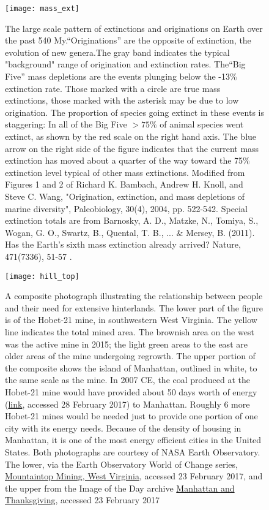\newpage
\begin{figure}[p]
\centering
\texttt{[image: mass\_ext]}%
\caption{The large scale pattern of extinctions and originations on Earth over the past 540 My.``Originations'' are the opposite of extinction, the evolution of new genera.The gray band indicates the typical "background" range of origination and extinction rates. The``Big Five'' mass depletions are the events plunging below the -13\% extinction rate. Those marked with a circle are true mass extinctions, those marked with the asterisk may be due to low origination. The proportion of species going extinct in these events is staggering: In all of the Big Five $>75\%$ of animal species went extinct, as shown by the red scale on the right hand axis. The blue arrow on the right side of the figure indicates that the current mass extinction has moved about a quarter of the way toward the 75\% extinction level typical of other mass extinctions. Modified from Figures 1 and 2 of Richard K. Bambach, Andrew H. Knoll, and Steve C. Wang, "Origination, extinction, and mass depletions of marine diversity", Paleobiology, 30(4), 2004, pp. 522-542. Special extinction totals are from Barnosky, A. D., Matzke, N., Tomiya, S., Wogan, G. O., Swartz, B., Quental, T. B., ... \& Mersey, B. (2011). Has the Earth's sixth mass extinction already arrived? Nature, 471(7336), 51-57 .}
\label{fig:mass_ext}
\end{figure}

\newpage
\begin{figure}[p]
\centering
\texttt{[image: hill\_top]}%

\caption{A composite photograph illustrating the relationship between people and their need for extensive hinterlands. The lower part of the figure is of the Hobet-21 mine, in southwestern West Virginia. The yellow line indicates the total mined area. The brownish area on the west was the active mine in 2015; the light green areas to the east are older areas of the mine undergoing regrowth. The  upper portion of the composite shows the island of Manhattan, outlined in white, to the same scale as the mine. In 2007 CE, the coal produced at the Hobet-21 mine would have provided about 50 days worth of energy (\href{https://www.nycedc.com/economic-data/july-2013-economic-snapshot}{link}, accessed 28 February 2017) to Manhattan. Roughly 6 more Hobet-21 mines would be needed just to provide one portion of one city with its energy needs. Because of the density of housing in Manhattan, it is one of the most energy efficient cities in the United States. Both photographs are courtesy of NASA Earth Observatory. The lower, via the Earth Observatory World of Change series, \href{http://earthobservatory.nasa.gov/Features/WorldOfChange/hobet.php}{Mountaintop Mining, West Virginia}, accessed 23 February 2017, and the upper from the Image of the Day archive \href{http://earthobservatory.nasa.gov/IOTD/view.php?id=82417}{Manhattan and Thanksgiving}, accessed 23 February 2017}  

\label{fig:hill_top}
\end{figure}

